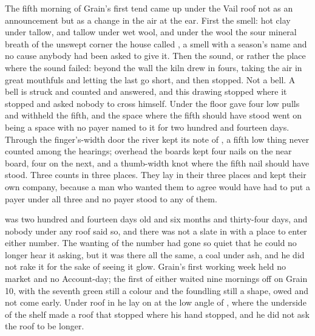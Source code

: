 
The fifth morning of Grain's first tend came up under the Vail roof not as an announcement but as a change in the air at the ear. First the smell: hot clay under tallow, and tallow under wet wool, and under the wool the sour mineral breath of the unswept corner the house called , a smell with a season's name and no cause anybody had been asked to give it. Then the sound, or rather the place where the sound failed: beyond the wall the kiln drew in fours, taking the air in great mouthfuls and letting the last go short, and then stopped. Not a bell. A bell is struck and counted and answered, and this drawing stopped where it stopped and asked nobody to cross himself. Under the floor  gave four low pulls and withheld the fifth, and the space where the fifth should have stood went on being a space with no payer named to it for two hundred and fourteen days. Through the finger's-width door the river kept its note of , a fifth low thing never counted among the hearings; overhead the boards kept four nails on the near board, four on the next, and a thumb-width knot where the fifth nail should have stood. Three counts in three places. They lay in their three places and kept their own company, because a man who wanted them to agree would have had to put a payer under all three and no payer stood to any of them.

 was two hundred and fourteen days old and six months and thirty-four days, and nobody under any roof said so, and there was not a slate in  with a place to enter either number. The wanting of the number had gone so quiet that he could no longer hear it asking, but it was there all the same, a coal under ash, and he did not rake it for the sake of seeing it glow. Grain's first working week held no market and no Account-day; the first of either waited nine mornings off on Grain 10, with the seventh green still a colour and the foundling still a shape, owed and not come early. Under  roof in  he lay on  at the low angle of , where the underside of the shelf made a roof that stopped where his hand stopped, and he did not ask the roof to be longer.


